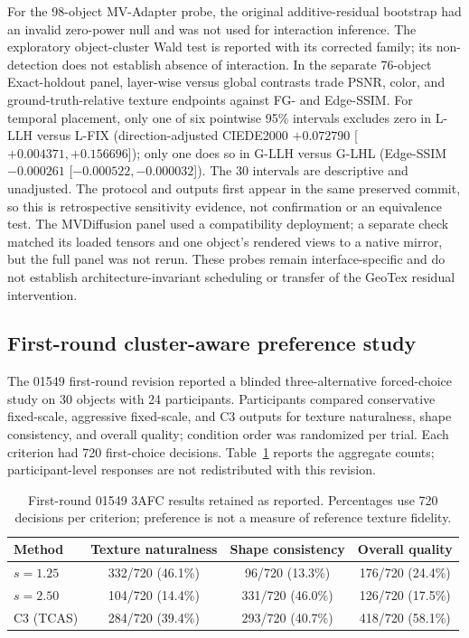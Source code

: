 \documentclass[times,twocolumn,final]{elsarticle}
\begin{document}
For the 98-object MV-Adapter probe, the original additive-residual bootstrap had an invalid zero-power null and was not used for interaction inference. The exploratory object-cluster Wald test is reported with its corrected family; its non-detection does not establish absence of interaction. In the separate 76-object Exact-holdout panel, layer-wise versus global contrasts trade PSNR, color, and ground-truth-relative texture endpoints against FG- and Edge-SSIM. For temporal placement, only one of six pointwise 95\% intervals excludes zero in L-LLH versus L-FIX (direction-adjusted CIEDE2000 $+0.072790$ [$+0.004371,+0.156696$]); only one does so in G-LLH versus G-LHL (Edge-SSIM $-0.000261$ [$-0.000522,-0.000032$]). The 30 intervals are descriptive and unadjusted. The protocol and outputs first appear in the same preserved commit, so this is retrospective sensitivity evidence, not confirmation or an equivalence test. The MVDiffusion panel used a compatibility deployment; a separate check matched its loaded tensors and one object's rendered views to a native mirror, but the full panel was not rerun. These probes remain interface-specific and do not establish architecture-invariant scheduling or transfer of the GeoTex residual intervention.

\subsection{First-round cluster-aware preference study}
\label{subsec:preference}

The 01549 first-round revision reported a blinded three-alternative forced-choice study on 30 objects with 24 participants. Participants compared conservative fixed-scale, aggressive fixed-scale, and C3 outputs for texture naturalness, shape consistency, and overall quality; condition order was randomized per trial. Each criterion had 720 first-choice decisions. Table~\ref{tab:preference} reports the aggregate counts; participant-level responses are not redistributed with this revision.

\begin{table}[t]
\centering\scriptsize
\caption{First-round 01549 3AFC results retained as reported. Percentages use 720 decisions per criterion; preference is not a measure of reference texture fidelity.}
\label{tab:preference}
\setlength{\tabcolsep}{3pt}
\begin{tabular}{lccc}
\toprule
Method & Texture naturalness & Shape consistency & Overall quality \\
\midrule
$s=1.25$ & 332/720 (46.1\%) & 96/720 (13.3\%) & 176/720 (24.4\%) \\
$s=2.50$ & 104/720 (14.4\%) & 331/720 (46.0\%) & 126/720 (17.5\%) \\
C3 (TCAS) & 284/720 (39.4\%) & 293/720 (40.7\%) & 418/720 (58.1\%) \\
\bottomrule
\end{tabular}
\end{table}
\end{document}
